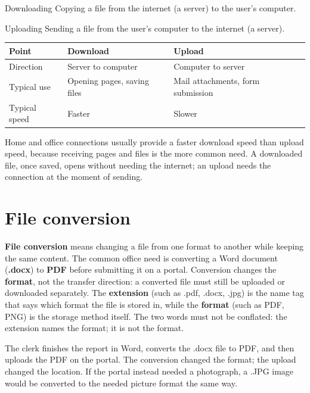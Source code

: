 \begin{definitionbox}{Downloading}
Copying a file from the internet (a server) to the user's computer.
\end{definitionbox}

\begin{definitionbox}{Uploading}
Sending a file from the user's computer to the internet (a server).
\end{definitionbox}

\begin{center}
\begin{tabular}{p{}p{}p{}}
\toprule
\textbf{Point} & \textbf{Download} & \textbf{Upload} \\
\midrule
Direction & Server to computer & Computer to server \\
Typical use & Opening pages, saving files & Mail attachments, form submission \\
Typical speed & Faster & Slower \\
\bottomrule
\end{tabular}
\end{center}

Home and office connections usually provide a faster download speed than
upload speed, because receiving pages and files is the more common need. A
downloaded file, once saved, opens without needing the internet; an upload
needs the connection at the moment of sending.

\section{File conversion}
\textbf{File conversion} means changing a file from one format to another
while keeping the same content. The common office need is converting a Word
document (\textbf{.docx}) to \textbf{PDF} before submitting it on a portal.
Conversion changes the \textbf{format}, not the transfer direction: a
converted file must still be uploaded or downloaded separately. The
\textbf{extension} (such as .pdf, .docx, .jpg) is the name tag that says
which format the file is stored in, while the \textbf{format} (such as PDF,
PNG) is the storage method itself. The two words must not be conflated: the
extension names the format; it is not the format.

\begin{example}
The clerk finishes the report in Word, converts the .docx file to PDF, and
then uploads the PDF on the portal. The conversion changed the format; the
upload changed the location. If the portal instead needed a photograph, a
.JPG image would be converted to the needed picture format the same way.
\end{example}

